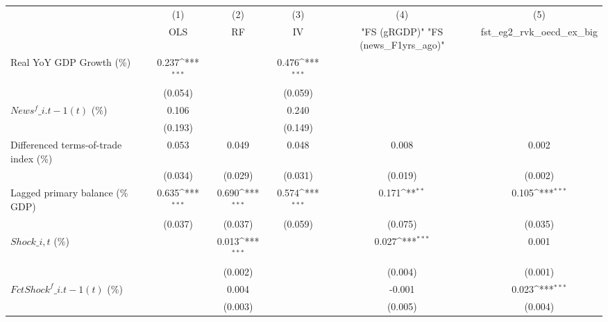 {
\def\sym#1{\ifmmode^{#1}\else\(^{#1}\)\fi}
\begin{tabular}{l*{5}{c}}
\toprule
                    &\multicolumn{1}{c}{(1)}&\multicolumn{1}{c}{(2)}&\multicolumn{1}{c}{(3)}&\multicolumn{1}{c}{(4)}&\multicolumn{1}{c}{(5)}\\
                    &\multicolumn{1}{c}{OLS}&\multicolumn{1}{c}{RF}&\multicolumn{1}{c}{IV}&\multicolumn{1}{c}{ "FS (gRGDP)"  "FS (news\_F1yrs\_ago)" }&\multicolumn{1}{c}{fst\_eg2\_rvk\_oecd\_ex\_big}\\
\midrule
Real YoY GDP Growth (\%)&       0.237\sym{***}&                     &       0.476\sym{***}&                     &                     \\
                    &     (0.054)         &                     &     (0.059)         &                     &                     \\
\addlinespace
$ News^f\_{i.t-1}(t)$ (\%)&       0.106         &                     &       0.240         &                     &                     \\
                    &     (0.193)         &                     &     (0.149)         &                     &                     \\
\addlinespace
Differenced terms-of-trade index (\%)&       0.053         &       0.049         &       0.048         &       0.008         &       0.002         \\
                    &     (0.034)         &     (0.029)         &     (0.031)         &     (0.019)         &     (0.002)         \\
\addlinespace
Lagged primary balance (\% GDP)&       0.635\sym{***}&       0.690\sym{***}&       0.574\sym{***}&       0.171\sym{**} &       0.105\sym{***}\\
                    &     (0.037)         &     (0.037)         &     (0.059)         &     (0.075)         &     (0.035)         \\
\addlinespace
$ Shock\_{i,t}$ (\%) &                     &       0.013\sym{***}&                     &       0.027\sym{***}&       0.001         \\
                    &                     &     (0.002)         &                     &     (0.004)         &     (0.001)         \\
\addlinespace
$ FctShock^f\_{i.t-1}(t)$ (\%)&                     &       0.004         &                     &      -0.001         &       0.023\sym{***}\\
                    &                     &     (0.003)         &                     &     (0.005)         &     (0.004)         \\

\end{tabular}}
